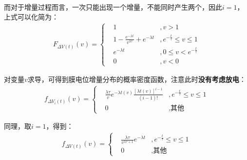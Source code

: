 \documentclass[11pt]{article}
\begin{document}
而对于增量过程而言，一次只能出现一个增量，不能同时产生两个，因此$i=1$，上式可以化简为：
\begin{align}
  F_{\Delta V(t)}(v) =\left\{\begin{aligned}
                                & 1                                                                     & ,v>1                              \\
                                & \displaystyle 1-\frac{e^{-\lambda t}}{v^{\lambda\tau}}+e^{-\lambda t} & , e^{-\frac{t}{\tau}} \le v \le 1 \\
                                & e^{-\lambda t}                                                        & ,0\le v<e^{-\frac{t}{\tau}}\\
                                & 0                                                                     & ,v<0
                             \end{aligned}\right.\label{eq:膜电位增量的分布}
\end{align}\par
对变量$v$求导，可得到膜电位增量分布的概率密度函数，注意此时\textbf{没有考虑放电}：
\begin{align}
  f_{\Delta V_i(t)}(v)=\left\{
  \begin{aligned}
     & \displaystyle\frac{\lambda\tau}{v}e^{-\lambda t(v)}\frac{[\lambda t(v)]^{i-1}}{(i-1)!} & ,e^{-\frac{t}{\tau}} \le v \le 1 \\
     & 0                                                                                      & ,\textrm{其他}
  \end{aligned}
  \right.
\end{align}\par
同理，取$i=1$，得到：
\begin{align}
  f_{\Delta V(t)}(v)=\left\{
  \begin{aligned}
     & \frac{\lambda\tau}{v^{\lambda \tau+1}}e^{-\lambda t} & ,e^{-\frac{t}{\tau}} \le v \le 1 \\
     & 0                                                    & ,\textrm{其他}
  \end{aligned}
  \right.\label{eq:膜电位增量的概率密度函数}
\end{align}\par
\end{document}
